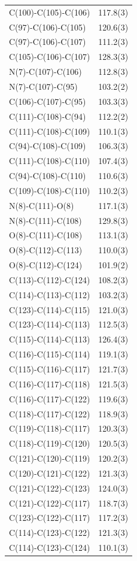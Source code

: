 \begin{center}
{\begin{supertabular}{p{1.5in}c}
C(100)-C(105)-C(106)&117.8(3)\\
C(97)-C(106)-C(105)&120.6(3)\\
C(97)-C(106)-C(107)&111.2(3)\\
C(105)-C(106)-C(107)&128.3(3)\\
N(7)-C(107)-C(106)&112.8(3)\\
N(7)-C(107)-C(95)&103.2(2)\\
C(106)-C(107)-C(95)&103.3(3)\\
C(111)-C(108)-C(94)&112.2(2)\\
C(111)-C(108)-C(109)&110.1(3)\\
C(94)-C(108)-C(109)&106.3(3)\\
C(111)-C(108)-C(110)&107.4(3)\\
C(94)-C(108)-C(110)&110.6(3)\\
C(109)-C(108)-C(110)&110.2(3)\\
N(8)-C(111)-O(8)&117.1(3)\\
N(8)-C(111)-C(108)&129.8(3)\\
O(8)-C(111)-C(108)&113.1(3)\\
O(8)-C(112)-C(113)&110.0(3)\\
O(8)-C(112)-C(124)&101.9(2)\\
C(113)-C(112)-C(124)&108.2(3)\\
C(114)-C(113)-C(112)&103.2(3)\\
C(123)-C(114)-C(115)&121.0(3)\\
C(123)-C(114)-C(113)&112.5(3)\\
C(115)-C(114)-C(113)&126.4(3)\\
C(116)-C(115)-C(114)&119.1(3)\\
C(115)-C(116)-C(117)&121.7(3)\\
C(116)-C(117)-C(118)&121.5(3)\\
C(116)-C(117)-C(122)&119.6(3)\\
C(118)-C(117)-C(122)&118.9(3)\\
C(119)-C(118)-C(117)&120.3(3)\\
C(118)-C(119)-C(120)&120.5(3)\\
C(121)-C(120)-C(119)&120.2(3)\\
C(120)-C(121)-C(122)&121.3(3)\\
C(121)-C(122)-C(123)&124.0(3)\\
C(121)-C(122)-C(117)&118.7(3)\\
C(123)-C(122)-C(117)&117.2(3)\\
C(114)-C(123)-C(122)&121.3(3)\\
C(114)-C(123)-C(124)&110.1(3)\\

\end{supertabular}}
\end{center}
